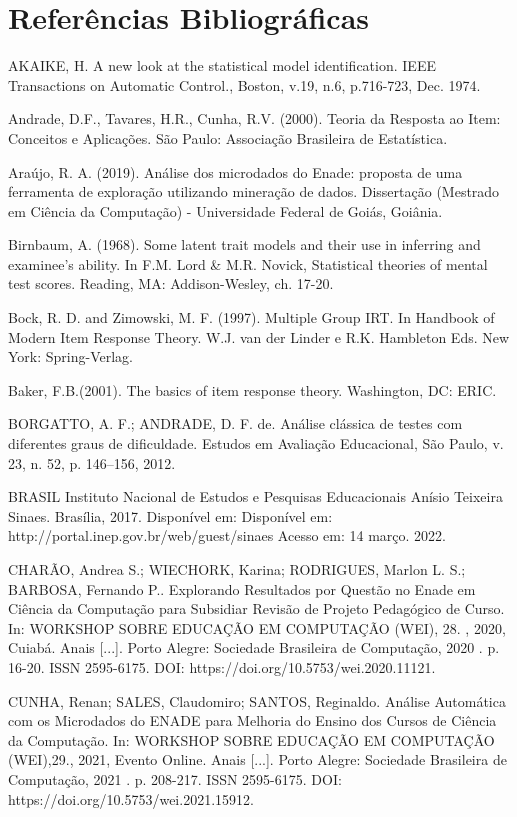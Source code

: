 \documentclass[12pt]{article}
\begin{document}
\newpage
\section{Referências Bibliográficas}

AKAIKE, H. A new look at the statistical model identification. IEEE Transactions on Automatic
Control., Boston, v.19, n.6, p.716-723, Dec. 1974.

Andrade, D.F., Tavares, H.R., Cunha, R.V. (2000). Teoria da Resposta ao Item: Conceitos e Aplicações. São Paulo: Associação Brasileira de Estatística.

Araújo, R. A. (2019). Análise dos microdados do Enade: proposta de uma ferramenta de exploração utilizando mineração de dados. Dissertação (Mestrado em Ciência da Computação) - Universidade Federal de Goiás, Goiânia.

Birnbaum, A. (1968). Some latent trait models and their use in inferring and examinee's ability. In F.M. Lord \& M.R. Novick, Statistical theories of mental test scores. Reading, MA: Addison-Wesley, ch. 17-20.

Bock, R. D. and Zimowski, M. F. (1997). Multiple Group IRT. In Handbook of Modern Item Response Theory. W.J. van der Linder e R.K. Hambleton Eds. New York: Spring-Verlag.

Baker, F.B.(2001). The basics of item response theory. Washington, DC: ERIC. 

BORGATTO, A. F.; ANDRADE, D. F. de. Análise clássica de testes com diferentes graus de dificuldade. Estudos em Avaliação Educacional, São Paulo, v. 23, n. 52, p. 146–156, 2012.

BRASIL Instituto Nacional de Estudos e Pesquisas Educacionais Anísio Teixeira Sinaes. Brasília, 2017. Disponível em: Disponível em: http://portal.inep.gov.br/web/guest/sinaes Acesso em: 14 março. 2022.

CHARÃO, Andrea S.; WIECHORK, Karina; RODRIGUES, Marlon L. S.; BARBOSA, Fernando P.. Explorando Resultados por Questão no Enade em Ciência da Computação para Subsidiar Revisão de Projeto Pedagógico de Curso. In: WORKSHOP SOBRE EDUCAÇÃO EM COMPUTAÇÃO (WEI), 28. , 2020, Cuiabá. Anais [...]. Porto Alegre: Sociedade Brasileira de Computação, 2020 . p. 16-20. ISSN 2595-6175. DOI: https://doi.org/10.5753/wei.2020.11121.

CUNHA, Renan; SALES, Claudomiro; SANTOS, Reginaldo. Análise Automática com os Microdados do ENADE para Melhoria do Ensino dos Cursos de Ciência da Computação. In: WORKSHOP SOBRE EDUCAÇÃO EM COMPUTAÇÃO (WEI),29., 2021, Evento Online. Anais [...]. Porto Alegre: Sociedade Brasileira de Computação, 2021 . p. 208-217. ISSN 2595-6175. DOI: https://doi.org/10.5753/wei.2021.15912.
\end{document}
